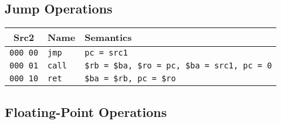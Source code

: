 \documentclass[10pt,DIV12]{scrartcl}
\begin{document}
\subsection{Jump Operations}
\label{sec:jop}

\begin{tabular}{cll}
\toprule
Src2 & Name & Semantics \\
\midrule
\texttt{000 00} & \texttt{jmp} & \texttt{pc = src1} \\
\texttt{000 01} & \texttt{call} & \texttt{\$rb = \$ba, \$ro = pc, \$ba = src1, pc = 0} \\
\texttt{000 10} & \texttt{ret} & \texttt{\$ba = \$rb, pc = \$ro} \\
\bottomrule  
\end{tabular}

\subsection{Floating-Point Operations}
\label{sec:fop}
\end{document}
